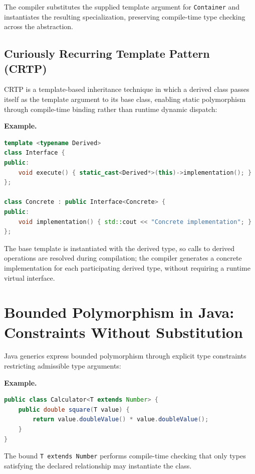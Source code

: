 \documentclass[11pt]{report}
\begin{document}
 The compiler substitutes the supplied template argument for
\texttt{Container} and instantiates the resulting specialization,
preserving compile-time type checking across the abstraction.

\subsection{Curiously Recurring Template Pattern (CRTP)}

CRTP is a template-based inheritance technique in which a derived class
passes itself as the template argument to its base class, enabling static
polymorphism through compile-time binding rather than runtime dynamic
dispatch:

\begin{examplebox}
\textbf{Example.}

\begin{lstlisting}[language=C++]
template <typename Derived>
class Interface {
public:
    void execute() { static_cast<Derived*>(this)->implementation(); }
};

class Concrete : public Interface<Concrete> {
public:
    void implementation() { std::cout << "Concrete implementation"; }
};
\end{lstlisting}
\end{examplebox}

The base template is instantiated with the derived type, so calls to
derived operations are resolved during compilation; the compiler generates
a concrete implementation for each participating derived type, without
requiring a runtime virtual interface.


\section{Bounded Polymorphism in Java: Constraints Without Substitution}
\label{Metaprogramming:JavaBoundedPolymorphism}

Java generics express bounded polymorphism through explicit type
constraints restricting admissible type arguments:

\begin{examplebox}
\textbf{Example.}

\begin{lstlisting}[language=Java]
public class Calculator<T extends Number> {
    public double square(T value) {
        return value.doubleValue() * value.doubleValue();
    }
}
\end{lstlisting}
The bound \texttt{T extends Number} performs compile-time checking that
only types satisfying the declared relationship may instantiate the class.
\end{examplebox}
\end{document}
